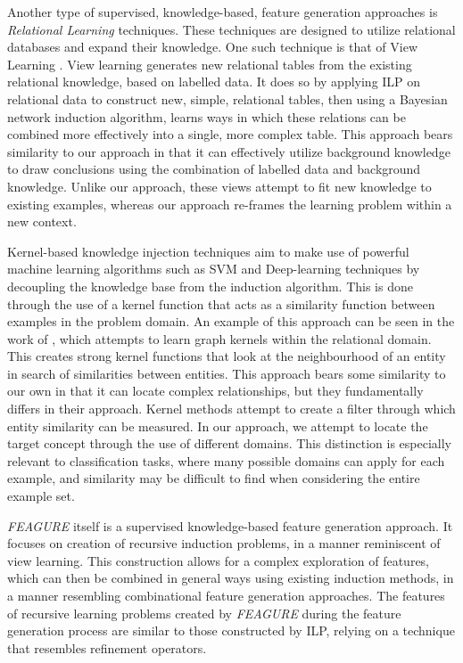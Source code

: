\documentclass[twoside,11pt]{article}
\theoremstyle{definition}
\begin{document}
Another type of supervised, knowledge-based, feature generation approaches is \emph{Relational Learning} techniques. These techniques are designed to utilize relational databases and expand their knowledge. One such technique is that of View Learning . View learning generates new relational tables from the existing relational knowledge, based on labelled data.
It does so by applying ILP on relational data to construct new, simple, relational tables, then using a Bayesian network induction algorithm, learns ways in which these relations can be combined more effectively into a single, more complex table.
This approach bears similarity to our approach in that it can effectively utilize background knowledge to draw conclusions using the combination of labelled data and background knowledge. Unlike our approach, these views attempt to fit new knowledge to existing examples, whereas our approach re-frames the learning problem within a new context.

Kernel-based knowledge injection techniques aim to make use of powerful machine learning algorithms such as SVM and Deep-learning techniques by decoupling the knowledge base from the induction algorithm. This is done through the use of a kernel function that acts as a similarity function between examples in the problem domain. An example of this approach can be seen in the work of , which attempts to learn graph kernels within the relational domain. This creates strong kernel functions that look at the neighbourhood of an entity in search of similarities between entities. This approach bears some similarity to our own in that it can locate complex relationships, but they fundamentally differs in their approach. Kernel methods attempt to create a filter through which entity similarity can be measured. In our approach, we attempt to locate the target concept through the use of different domains. This distinction is especially relevant to classification tasks, where many possible domains can apply for each example, and similarity may be difficult to find when considering the entire example set.

\emph{FEAGURE} itself is a supervised knowledge-based feature generation approach. It focuses on creation of recursive induction problems, in a manner reminiscent of view learning. This construction allows for a complex exploration of features, which can then be combined in general ways using existing induction methods, in a manner resembling combinational feature generation approaches.
The features of recursive learning problems created by \emph{FEAGURE} during the feature generation process are similar to those constructed by ILP, relying on a technique that resembles refinement operators. 
\end{document}
